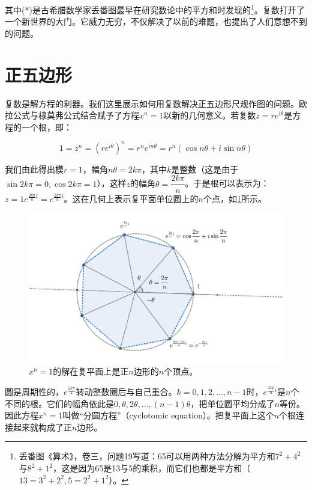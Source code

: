 \documentclass[b5paper]{ctexart}
\begin{document}
其中(*)是古希腊数学家丢番图最早在研究数论中的平方和时发现的\footnote{丢番图《算术》，卷三，问题19写道：65可以用两种方法分解为平方和$7^2 + 4^2$与$8^2 + 1^2$，这是因为65是13与5的乘积，而它们也都是平方和（$13 = 3^2 + 2^2, 5 = 2^2 + 1^2$）。}。复数打开了一个新世界的大门。它威力无穷，不仅解决了以前的难题，也提出了人们意想不到的问题。

\section{正五边形}
\label{sec:pentagon-equation}

复数是解方程的利器。我们这里展示如何用复数解决正五边形尺规作图的问题。欧拉公式与棣莫弗公式结合赋予了方程$x^n = 1$以新的几何意义。若复数$z = re^{i\theta}$是方程的一个根，即：

\[
1 = z^n = (re^{i\theta})^n = r^ne^{in\theta} = r^n(\cos n\theta + i\sin n\theta)
\]

我们由此得出模$r = 1$，幅角$n\theta = 2k\pi$，其中$k$是整数（这是由于$\sin 2k\pi = 0, \cos 2k\pi = 1$），这样$z$的幅角$\theta = \dfrac{2k\pi}{n}$。于是根可以表示为：$z = 1e^{\frac{2k\pi}{n}i} = e^{\frac{2k\pi}{n}i}$。这在几何上表示复平面单位圆上的$n$个点，如\cref{fig:heptagon-z}所示。

\begin{figure}[htbp]
  \centering
  \includegraphics[scale=0.33]{img/heptagon-z}
  \caption{$x^n = 1$的解在复平面上是正$n$边形的$n$个顶点。}
 \label{fig:heptagon-z}
\end{figure}

圆是周期性的，$e^{\frac{2k\pi}{2}}$转动整数圈后与自己重合。$k = 0, 1, 2, \dotsc, n-1$时，$e^{\frac{2kp}{n}i}$是$n$个不同的根。它们的幅角依此是$0, \theta, 2\theta, \dotsc, (n-1)\theta$，把单位圆平均分成了$n$等份。因此方程$x^n = 1$叫做“分圆方程”（cyclotomic equation）。把复平面上这个$n$个根连接起来就构成了正$n$边形。
\end{document}
